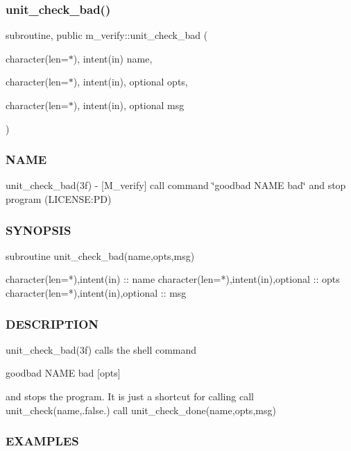 \subsubsection{\texorpdfstring{unit\+\_\+check\+\_\+bad()}{unit\_check\_bad()}}
{\footnotesize\ttfamily subroutine, public m\+\_\+verify\+::unit\+\_\+check\+\_\+bad (\begin{DoxyParamCaption}\item[{character(len=$\ast$), intent(in)}]{name,  }\item[{character(len=$\ast$), intent(in), optional}]{opts,  }\item[{character(len=$\ast$), intent(in), optional}]{msg }\end{DoxyParamCaption})}



\subsubsection*{N\+A\+ME}

unit\+\_\+check\+\_\+bad(3f) -\/ \mbox{[}M\+\_\+verify\mbox{]} call command \char`\"{}goodbad N\+A\+M\+E bad\char`\"{} and stop program (L\+I\+C\+E\+N\+SE\+:PD) 

\subsubsection*{S\+Y\+N\+O\+P\+S\+IS}

\begin{DoxyVerb}subroutine unit_check_bad(name,opts,msg)

 character(len=*),intent(in) :: name
 character(len=*),intent(in),optional :: opts
 character(len=*),intent(in),optional :: msg
\end{DoxyVerb}


\subsubsection*{D\+E\+S\+C\+R\+I\+P\+T\+I\+ON}

\begin{DoxyVerb}unit_check_bad(3f) calls the shell command

     goodbad NAME bad [opts]

and stops the program. It is just a shortcut for calling
     call unit_check(name,.false.)
     call unit_check_done(name,opts,msg)
\end{DoxyVerb}


\subsubsection*{E\+X\+A\+M\+P\+L\+ES}

